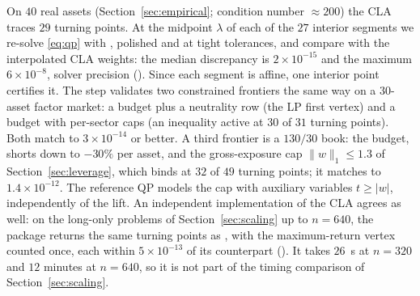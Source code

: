 On $40$ real assets (Section~\ref{sec:empirical}; condition number $\approx 200$) the CLA
traces $29$ turning points. At the midpoint $\lambda$ of each of the $27$ interior
segments we re-solve \eqref{eq:qp} with  \citep{stellato2020}, polished and
at tight tolerances, and compare with the interpolated CLA weights: the median
discrepancy is $2\times 10^{-15}$ and the maximum $6\times 10^{-8}$, solver precision
(). Since each segment is
affine, one interior point certifies it. The step 
validates two constrained frontiers the same way on a $30$-asset factor market: a budget plus
a neutrality row (the LP first vertex) and a budget with per-sector caps (an inequality
active at $30$ of $31$ turning points). Both match to $3\times 10^{-14}$ or better. A third
frontier is a $130/30$ book: the budget, shorts down to $-30\%$ per asset, and the
gross-exposure cap $\lVert w\rVert_1 \le 1.3$ of Section~\ref{sec:leverage}, which binds at
$32$ of $49$ turning points; it matches to $1.4\times 10^{-12}$. The reference QP models
the cap with auxiliary variables $t \ge \lvert w\rvert$, independently of the lift.
An independent implementation of the CLA agrees as well: on the long-only problems of
Section~\ref{sec:scaling} up to $n = 640$, the  package 
\citep{rcla} returns the same turning points as , with the
maximum-return vertex counted once, each within $5\times10^{-13}$ of its counterpart
(). It takes $26$~s at $n = 320$ and $12$ minutes at
$n = 640$, so it is not part of the timing comparison of Section~\ref{sec:scaling}.

